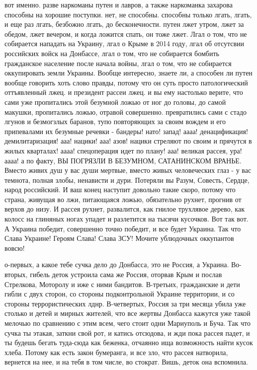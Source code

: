 вот именно. разве наркоманы путен и лавров, а также наркоманка захарова
способны на хорошие поступки. нет, не способны. способны только лгать, лгать, и
еще раз лгать, безбожно лгать, до бесконечности. путен лжет утром, лжет за
обедом, лжет вечером, и когда ложится спать, он тоже лжет. Лгал о том, что не
собирается нападать на Украину, лгал о Крыме в 2014 году, лгал об отсутсвии
российских войск на Донбассе, лгал о том, что не собирается бомбить гражданское
население после начала войны, лгал о том, что не собирается оккупировать земли
Украины. Вообще интересно, знаете ли, а способен ли путен вообще говорить хоть
слово правды, потому что он суть просто патологический оттъявленный лжец. и
президент рассеи лжец. и вы ему настолько верите, что сами уже пропитались этой
безумной ложью от ног до головы, до самой макушки, пропитались ложью, отравой
совершенно. превратились сами с стадо лгунов и безмогзлых баранов, тупо
повторяющих за своим вождем и его припевалами их безумные речевки  - бандеры!
нато! запад! аааа! денацификация! демилитаризация! ааа! нацики! ааа! азов!
нацики стреляют по своим и прячутся в жилых кварталах! аааа! спецоперация идет
по плану! ааа! великая рассея, ура! аааа! а по факту, ВЫ ПОГРЯЗЛИ В БЕЗУМНОМ,
САТАНИНСКОМ ВРАНЬЕ. Вместо живих душ у вас души мертвые, вместо живых
человеческих глаз - у вас темнота, полная злобы, ненависти и дури. Потеряли вы
Разум, Совесть, Сердце, народ российский. И ваш конец наступит довольно такие
скоро, потому что страна, живущая во лжи, питающаяся ложью, обязательно рухнет,
прогнив от верхов до низу. И рассея рухнет, развалится, как гнилое трухлявое
дерево, как колосс на глиняных ногах упадет и разлетится на тысячи кусочков.
Вот так вот. А Украина победит, совершенно точно победит, и все будет Украина.
Так что Слава Украине! Героям Слава! Слава ЗСУ! Мочите ублюдочных оккупантов
вовсю! 

о-первых, а какое тебе сучка дело до Донбасса, это не Россия, а Украина.
Во-вторых, гибель деток устроила сама же Россия, оторвав Крым и послав
Стрелкова, Моторолу и иже с ними бандитов. В-третьих, гражданские и дети гибли
с двух сторон, со стороны подконтрольной Украине территории, и со стороны
террористических лднр. В-четвертых, Россия за три месяца убила уже столько и
детей и мирных жителей, что все жертвы Донбасса кажутся уже такой мелочью по
сравнению с этим всем, чего стоит одни Мариуполь и Буча. Так что сучка ты
этакая, заткни свой рот, и катись отсюдова, и жди пока рассея падет, и ты
будешь бегать туда-сюда как беженка, отчаянно ища возможность найти кусок
хлеба. Потому как есть закон бумеранга, и все зло, что рассея натворила,
вернется на нее, и на тебя в том числе, во стократ. Вишь, деток она вспомнила.

